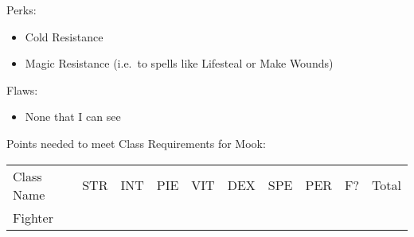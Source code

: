 \documentclass[12pt]{article}
\providecommand{\tightlist}{%
  \setlength{\itemsep}{0pt}\setlength{\parskip}{0pt}}
\begin{document}
Perks:

\begin{itemize}
\item
  Cold Resistance
\item
  Magic Resistance (i.e.~to spells like Lifesteal or Make Wounds)
\end{itemize}

Flaws:

\begin{itemize}
\tightlist
\item
  None that I can see
\end{itemize}

Points needed to meet Class Requirements for Mook:

\begin{longtable}[]{@{}llllllllll@{}}
\toprule
\begin{minipage}[t]{0.13\columnwidth}\raggedright\strut
Class Name
\strut\end{minipage} &
\begin{minipage}[t]{0.06\columnwidth}\raggedright\strut
STR
\strut\end{minipage} &
\begin{minipage}[t]{0.06\columnwidth}\raggedright\strut
INT
\strut\end{minipage} &
\begin{minipage}[t]{0.06\columnwidth}\raggedright\strut
PIE
\strut\end{minipage} &
\begin{minipage}[t]{0.06\columnwidth}\raggedright\strut
VIT
\strut\end{minipage} &
\begin{minipage}[t]{0.06\columnwidth}\raggedright\strut
DEX
\strut\end{minipage} &
\begin{minipage}[t]{0.06\columnwidth}\raggedright\strut
SPE
\strut\end{minipage} &
\begin{minipage}[t]{0.06\columnwidth}\raggedright\strut
PER
\strut\end{minipage} &
\begin{minipage}[t]{0.07\columnwidth}\raggedright\strut
F?
\strut\end{minipage} &
\begin{minipage}[t]{0.08\columnwidth}\raggedright\strut
Total
\strut\end{minipage}\tabularnewline
\begin{minipage}[t]{0.13\columnwidth}\raggedright\strut
Fighter
\strut\end{minipage} &

\end{longtable}
\end{document}

